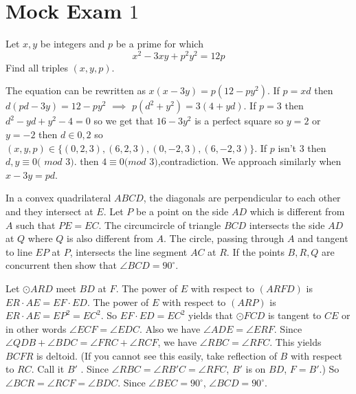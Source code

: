 \documentclass{subfile}
\begin{document}
		\newpage
		
		\section{Mock Exam $1$}
		\begin{problem}
		    Let $x, y$ be integers and $p$ be a prime for which
		    \[ x^2-3xy+p^2y^2=12p \]
		    Find all triples $(x,y,p)$.
		\end{problem}
		
		\begin{solution}
		    The equation can be rewritten as $x(x - 3y) = p(12 - py^2)$.
            If $p = xd$ then $d(pd - 3y) = 12 - py^2$ $\implies$ $p(d^2+y^2) = 3(4 + yd)$.
            If $p = 3$ then $d^2 - yd + y^2 - 4 = 0$ so we get that $16 - 3y^2$ is a perfect square so $y = 2$ or $y = -2$ then $d \in {0,2}$ so $(x,y,p) \in \{(0,2,3),(6,2,3),(0,-2,3),(6,-2,3)\}$.
            If $p$ isn't $3$ then $d,y \equiv 0 ($ $mod$ $3)$. then $4 \equiv 0 (mod$ $3)$,contradiction.
            We approach similarly when $x - 3y = pd$.
        \end{solution}
        
        \begin{problem}
            In a convex quadrilateral $ABCD$, the diagonals are perpendicular to each other and they intersect at $E$. Let $P$ be a point on the side $AD$ which is different from $A$ such that $PE=EC.$ The circumcircle of triangle $BCD$ intersects the side $AD$ at $Q$ where $Q$ is also different from $A$. The circle, passing through $A$ and tangent to line $EP$ at $P$, intersects the line segment $AC$ at $R$. If the points $B, R, Q$ are concurrent then show that $\angle BCD=90^{\circ}$.
        \end{problem}
        
        \begin{solution}
            Let $\odot ARD$ meet $BD$ at $F$.
            The power of $E$ with respect to $(ARFD)$ is $ER \cdot AE = EF \cdot ED$.
            The power of $E$ with respect to $(ARP)$ is $ER\cdot AE = EP ^2 = EC^2$.
            So $EF \cdot ED = EC^2$ yields that $\odot FCD$ is tangent to $CE$ or in other words $\angle ECF = \angle EDC$.
            Also we have $\angle ADE = \angle ERF$.
            Since $\angle QDB + \angle BDC = \angle FRC + \angle RCF$, we have $\angle RBC = \angle RFC$.
            This yields $BCFR$ is deltoid.
            (If you cannot see this easily, take reflection of $B$ with respect to $RC$. Call it $B'$ . Since $\angle RBC = \angle RB'C = \angle RFC$, $B'$ is on $BD$, $F=B'$.)
            So $\angle BCR = \angle RCF = \angle BDC$. Since $\angle BEC = 90^\circ$, $\angle BCD = 90^\circ$.
		\end{solution}
		
\end{document}
